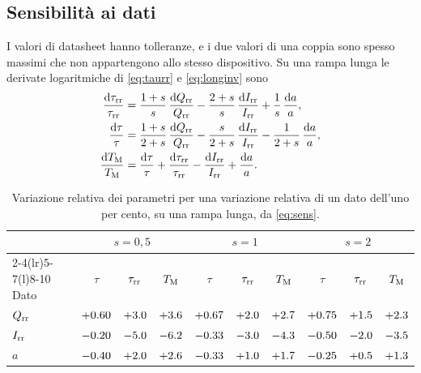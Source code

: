 \documentclass[10pt,a4paper]{scrartcl}
\let\newcommand\lmitdefine
\newcommand{\Irr}{I_\mathrm{rr}}
\newcommand{\Qrr}{Q_\mathrm{rr}}
\newcommand{\taurr}{\tau_\mathrm{rr}}
\newcommand{\TM}{T_\mathrm{M}}
\newcommand{\diff}{\mathrm{d}}
\begin{document}
\subsection{Sensibilità ai dati}
\label{sec:sens}
I valori di datasheet hanno tolleranze, e i due valori di una coppia sono spesso massimi che non appartengono allo stesso dispositivo. Su una rampa lunga le derivate logaritmiche di \eqref{eq:taurr} e \eqref{eq:longinv} sono
\begin{equation}
\begin{aligned}
\frac{\diff\taurr}{\taurr} &= \frac{1+s}{s}\,\frac{\diff\Qrr}{\Qrr} - \frac{2+s}{s}\,\frac{\diff\Irr}{\Irr} + \frac{1}{s}\,\frac{\diff a}{a} , \\
\frac{\diff\tau}{\tau} &= \frac{1+s}{2+s}\,\frac{\diff\Qrr}{\Qrr} - \frac{s}{2+s}\,\frac{\diff\Irr}{\Irr} - \frac{1}{2+s}\,\frac{\diff a}{a} , \\
\frac{\diff\TM}{\TM} &= \frac{\diff\tau}{\tau} + \frac{\diff\taurr}{\taurr} - \frac{\diff\Irr}{\Irr} + \frac{\diff a}{a} .
\end{aligned}
\label{eq:sens}
\end{equation}

\begin{table}[htb]
\centering\small
\caption{Variazione relativa dei parametri per una variazione relativa di un dato dell'uno per cento, su una rampa lunga, da \eqref{eq:sens}.}
\label{tab:sens}
\begin{tabular}{@{}lccccccccc@{}}
\toprule
 & \multicolumn{3}{c}{$s = 0,5$} & \multicolumn{3}{c}{$s = 1$} & \multicolumn{3}{c}{$s = 2$} \\
\cmidrule(lr){2-4}\cmidrule(lr){5-7}\cmidrule(l){8-10}
Dato & $\tau$ & $\taurr$ & $\TM$ & $\tau$ & $\taurr$ & $\TM$ & $\tau$ & $\taurr$ & $\TM$ \\
\midrule
$\Qrr$ & $+0.60$ & $+3.0$ & $+3.6$ & $+0.67$ & $+2.0$ & $+2.7$ & $+0.75$ & $+1.5$ & $+2.3$ \\
$\Irr$ & $-0.20$ & $-5.0$ & $-6.2$ & $-0.33$ & $-3.0$ & $-4.3$ & $-0.50$ & $-2.0$ & $-3.5$ \\
$a$ & $-0.40$ & $+2.0$ & $+2.6$ & $-0.33$ & $+1.0$ & $+1.7$ & $-0.25$ & $+0.5$ & $+1.3$ \\
\bottomrule
\end{tabular}
\end{table}
\end{document}
